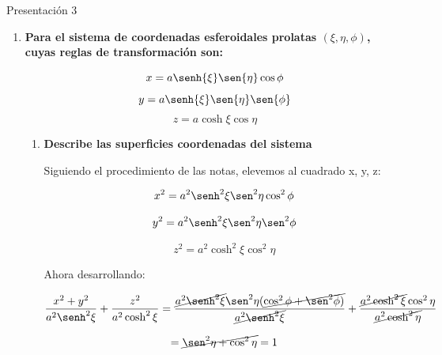 \documentclass[12pt,a4paper]{article}
\begin{document}
Presentación 3

\begin{enumerate}
    \item \textbf{Para el sistema de coordenadas esferoidales prolatas $(\xi, \eta, \phi)$, cuyas reglas de transformación son:}
    
    \begin{equation*}
        x = a \senh{\xi} \sen{\eta} \cos{\phi} 
    \end{equation*}
    \begin{equation*}
        y = a \senh{\xi} \sen{\eta} \sen{\phi}
    \end{equation*}
    \begin{equation*}
        z = a \cosh{\xi} \cos{\eta} 
    \end{equation*}
    
    \begin{enumerate}
        \item \textbf{Describe las superficies coordenadas del sistema}
        
        Siguiendo el procedimiento de las notas, elevemos al cuadrado x, y, z:
        
        \begin{equation*}
            x^2 = a^2 \senh^2{\xi} \sen^2{\eta} \cos^2{\phi}
        \end{equation*}
        
        \begin{equation*}
            y^2 = a^2 \senh^2{\xi} \sen^2{\eta} \sen^2{\phi}
        \end{equation*}
        
        \begin{equation*}
            z^2 = a^2 \cosh^2{\xi} \cos^2{\eta}
        \end{equation*}
        
        Ahora desarrollando:
        
        \begin{equation*}
            \frac{x^2 + y^2}{a^2 \senh^2{\xi}} + \frac{z^2}{a^2 \cosh^2{\xi}} = \frac{\cancel{a^2 \senh^2{\xi}} \sen^2{\eta}(\cancel{\cos^2{\phi + \sen^2{\phi}})}}{\cancel{a^2 \senh^2{\xi}}} + \frac{\cancel{a^2 \cosh^2{\xi}}\cos^2{\eta}}{\cancel{a^2 \cosh^2{\eta}}}
        \end{equation*}
        
        \begin{equation*}
            = \cancel{\sen^2{\eta} + \cos^2{\eta}} = 1
        \end{equation*}
        

\end{enumerate}
\end{enumerate}
\end{document}
